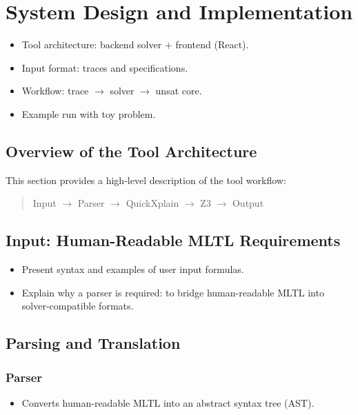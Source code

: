 \documentclass[12pt]{report}
\begin{document}
\chapter{System Design and Implementation}

\begin{itemize}
  \item Tool architecture: backend solver + frontend (React).
  \item Input format: traces and specifications.
  \item Workflow: trace $\rightarrow$ solver $\rightarrow$ unsat core.
  \item Example run with toy problem.
\end{itemize}

\section{Overview of the Tool Architecture}
This section provides a high-level description of the tool workflow:
\begin{quote}
Input $\rightarrow$ Parser $\rightarrow$ QuickXplain $\rightarrow$ Z3 $\rightarrow$ Output
\end{quote}

\section{Input: Human-Readable MLTL Requirements}
\begin{itemize}
  \item Present syntax and examples of user input formulas.
  \item Explain why a parser is required: to bridge human-readable MLTL into solver-compatible formats.
\end{itemize}

\section{Parsing and Translation}
\subsection{Parser}
\begin{itemize}
  \item Converts human-readable MLTL into an abstract syntax tree (AST).
\end{itemize}
\end{document}
